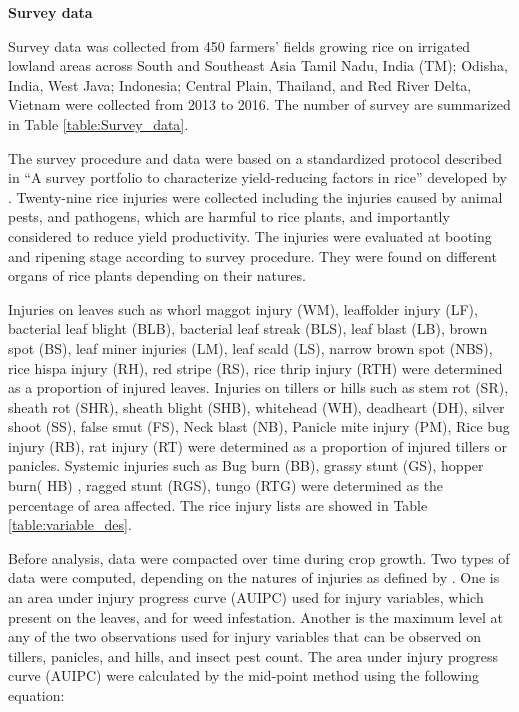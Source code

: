 \textbf{Survey data}

Survey data was collected from 450 farmers’ fields growing rice on irrigated lowland areas across South and Southeast Asia Tamil Nadu, India (TM); Odisha, India, West Java; Indonesia; Central Plain, Thailand, and Red River Delta, Vietnam were collected from 2013 to 2016. The number of survey are summarized in Table \ref{table:Survey_data}.



The survey procedure and data were based on a standardized protocol described in ``A survey portfolio to characterize yield-reducing factors in rice'' developed by \citet{Savary_2009_Survey}. Twenty-nine rice injuries were collected 
including the injuries caused by animal pests, and pathogens, which are harmful to rice plants, and importantly considered to reduce yield productivity. The injuries were evaluated at booting and ripening stage according to survey procedure. They were found on different organs of rice plants depending on their natures. 

Injuries on leaves such as whorl maggot injury (WM), leaffolder injury (LF), bacterial leaf blight (BLB), bacterial leaf streak (BLS), leaf blast (LB), brown spot (BS), leaf miner injuries (LM), leaf scald (LS), narrow brown spot (NBS), rice hispa injury (RH), red stripe (RS), rice thrip injury (RTH) were determined as a proportion of injured leaves. Injuries on tillers or hills such as stem rot (SR), sheath rot (SHR), sheath blight (SHB), whitehead (WH), deadheart (DH), silver shoot (SS), false smut (FS), Neck blast (NB), Panicle mite injury (PM), Rice bug injury (RB), rat injury (RT) were determined as a proportion of injured tillers or panicles. Systemic injuries such as Bug burn (BB), grassy stunt (GS), hopper burn( HB)  , ragged stunt (RGS), tungo (RTG) were determined as the percentage of area affected. The rice injury lists are showed in Table \ref{table:variable_des}.



Before analysis, data were compacted over time during crop growth. Two types of data were computed, depending on the natures of injuries as defined by \citep{Savary_2009_Survey}. One is an area under injury progress curve (AUIPC) used for injury variables, which present on the leaves, and for weed infestation. Another is the maximum level at any of the two observations used for injury variables that can be observed on tillers, panicles, and hills, and insect pest count. The area under injury progress curve (AUIPC) \citep{Campbell_1990_Introduction} were calculated by the mid-point method using the following equation:  

